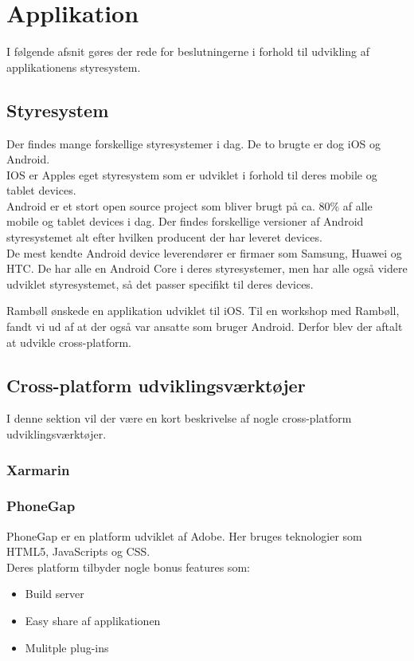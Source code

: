 \chapter{Applikation}                                   
I følgende afsnit gøres der rede for beslutningerne i forhold til udvikling af applikationens styresystem.

\section{Styresystem}
Der findes mange forskellige styresystemer i dag. De to brugte er dog iOS \cite{iOS} og Android. \cite{Android} \\
IOS er Apples eget styresystem som er udviklet i forhold til deres mobile og tablet devices. \\
Android er et stort open source project som bliver brugt på ca. 80\% af alle mobile og tablet devices i dag. Der findes forskellige versioner af Android styresystemet alt efter hvilken producent der har leveret devices. \\
De mest kendte Android device leverendører er firmaer som Samsung, Huawei og HTC. De har alle en Android Core i deres styresystemer, men har alle også videre udviklet styresystemet, så det passer specifikt til deres devices.

Rambøll ønskede en applikation udviklet til iOS. Til en workshop med Rambøll, fandt vi ud af at der også var ansatte som bruger Android. Derfor blev der aftalt at udvikle cross-platform. \\

\section{Cross-platform udviklingsværktøjer}
I denne sektion vil der være en kort beskrivelse af nogle cross-platform udviklingsværktøjer.
\subsection{Xarmarin}

\subsection{PhoneGap}
PhoneGap er en platform udviklet af Adobe\cite{Adobe}. Her bruges teknologier som HTML5\cite{HTML5}, JavaScripts\cite{JavaScript} og CSS\cite{CSS}. \\
Deres platform tilbyder nogle bonus features som:
\begin{itemize}[-]
	\item Build server
	\item Easy share af applikationen 
	\item Mulitple plug-ins
\end{itemize}

